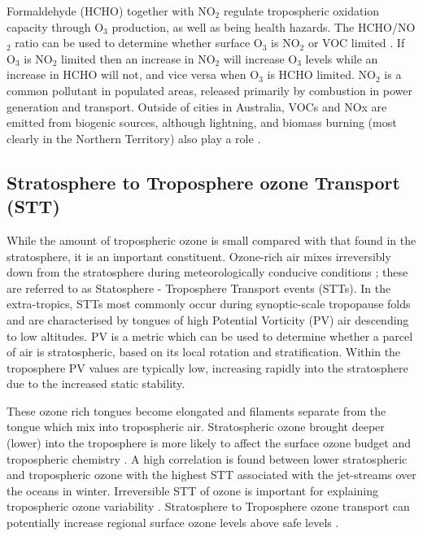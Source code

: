    Formaldehyde (HCHO) together with NO$_2$ regulate tropospheric oxidation capacity through O$_3$ production, as well as being health hazards.
    The HCHO/NO$_2$ ratio can be used to determine whether surface O$_3$ is NO$_2$ or VOC limited \citep{Mahajan2015}.
    If O$_3$ is NO$_2$ limited then an increase in NO$_2$ will increase O$_3$ levels while an increase in HCHO will not, and vice versa when O$_3$ is HCHO limited.
    NO$_2$ is a common pollutant in populated areas, released primarily by combustion in power generation and transport. 
    Outside of cities in Australia, VOCs and NOx are emitted from biogenic sources, although lightning, and biomass burning (most clearly in the Northern Territory) also play a role \citep{Guenther2006, VanDerA2008}.

  \subsection{Stratosphere to Troposphere ozone Transport (STT)}
  
    While the amount of tropospheric ozone is small compared with that found in the stratosphere, it is an important constituent.
    Ozone-rich air mixes irreversibly down from the stratosphere during meteorologically conducive conditions \citep{Sprenger2003,Mihalikova2012}; these are referred to as Statosphere - Troposphere Transport events (STTs). 
    In the extra-tropics, STTs most commonly occur during synoptic-scale tropopause folds \citep{Sprenger2003} and are characterised by tongues of high Potential Vorticity (PV) air descending to low altitudes. 
    PV is a metric which can be used to determine whether a parcel of air is stratospheric, based on its local rotation and stratification.
    Within the troposphere PV values are typically low, increasing rapidly into the stratosphere due to the increased static stability.
    
    These ozone rich tongues become elongated and filaments separate from the tongue which mix into tropospheric air.
    Stratospheric ozone brought deeper (lower) into the troposphere is more likely to affect the surface ozone budget and tropospheric chemistry \citep{Zanis2003,Langford_2009}.
    A high correlation is found between lower stratospheric and tropospheric ozone \citep{Terao2008} with the highest STT associated with the jet-streams over the oceans in winter.
    Irreversible STT of ozone is important for explaining tropospheric ozone variability \citep{Tang2010}.
    Stratosphere to Troposphere ozone transport can potentially increase regional surface ozone levels above safe levels \citep{Zhang2014}.
    
